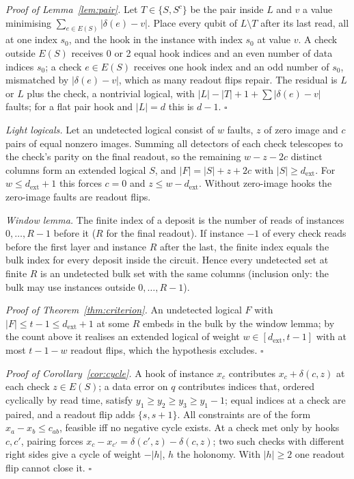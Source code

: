 \documentclass[aps,prl,twocolumn,superscriptaddress,nofootinbib]{revtex4-2}
\newcommand{\dext}{d_{\mathrm{ext}}}
\begin{document}
\emph{Proof of Lemma~\ref{lem:pair}.} Let $T\in\{S,S^c\}$ be the pair inside $L$ and $v$ a
value minimising $\sum_{e\in E(S)}|\delta(e)-v|$. Place every qubit of $L\setminus T$ after
its last read, all at one index $s_0$, and the hook in the instance with index $s_0$ at
value $v$. A check outside $E(S)$ receives 0 or 2 equal hook indices and an even number of
data indices $s_0$; a check $e\in E(S)$ receives one hook index and an odd number of $s_0$,
mismatched by $|\delta(e)-v|$, which as many readout flips repair. The residual is $L$ or
$L$ plus the check, a nontrivial logical, with $|L|-|T|+1+\sum|\delta(e)-v|$ faults; for
a flat pair hook and $|L|=d$ this is $d-1$. $\square$

\emph{Light logicals.} Let an undetected logical consist of $w$ faults, $z$ of zero image
and $c$ pairs of equal nonzero images. Summing all detectors of each check telescopes to
the check's parity on the final readout, so the remaining $w-z-2c$ distinct columns form
an extended logical $S$, and $|F|=|S|+z+2c$ with $|S|\ge\dext$. For $w\le\dext+1$ this forces
$c=0$ and $z\le w-\dext$. Without zero-image hooks the zero-image faults are readout flips.

\emph{Window lemma.} The finite index of a deposit is the number of reads of instances
$0,\dots,R-1$ before it ($R$ for the final readout). If instance $-1$ of every check reads
before the first layer and instance $R$ after the last, the finite index equals the bulk
index for every deposit inside the circuit. Hence every undetected set at finite $R$ is an
undetected bulk set with the same columns (inclusion only: the bulk may use instances
outside $0,\dots,R-1$).

\emph{Proof of Theorem~\ref{thm:criterion}.} An undetected logical $F$ with $|F|\le t-1\le
\dext+1$ at some $R$ embeds in the bulk by the window lemma; by the count above it realises
an extended logical of weight $w\in[\dext,t-1]$ with at most $t-1-w$ readout flips, which
the hypothesis excludes. $\square$

\emph{Proof of Corollary~\ref{cor:cycle}.} A hook of instance $x_c$ contributes
$x_c+\delta(c,z)$ at each check $z\in E(S)$; a data error on $q$ contributes indices that,
ordered cyclically by read time, satisfy $y_1\ge y_2\ge y_3\ge y_1-1$; equal indices at a
check are paired, and a readout flip adds $\{s,s+1\}$. All constraints are of the form
$x_a-x_b\le c_{ab}$, feasible iff no negative cycle exists. At a check met only by hooks
$c,c'$, pairing forces $x_c-x_{c'}=\delta(c',z)-\delta(c,z)$; two such checks with different
right sides give a cycle of weight $-|h|$, $h$ the holonomy. With $|h|\ge2$ one readout flip
cannot close it. $\square$
\end{document}
